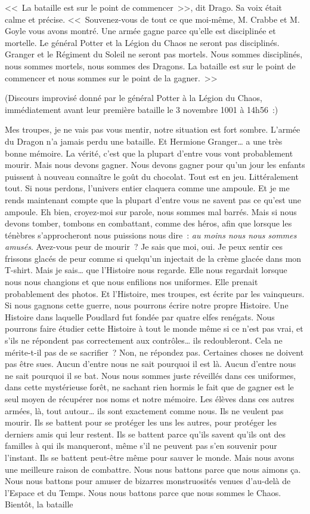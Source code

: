<<~La bataille est sur le point de commencer~>>, dit Drago. Sa voix était calme et précise. <<~Souvenez-vous de tout ce que moi-même, M. Crabbe et M. Goyle vous avons montré. Une armée gagne parce qu'elle est disciplinée et mortelle. Le général Potter et la Légion du Chaos ne seront pas disciplinés. Granger et le Régiment du Soleil ne seront pas mortels. Nous sommes disciplinés, nous sommes mortels, nous sommes des Dragons. La bataille est sur le point de commencer et nous sommes sur le point de la gagner.~>>

\later

(Discours improvisé donné par le général Potter à la Légion du Chaos, immédiatement avant leur première bataille le 3 novembre 1001 à 14h56~:)

Mes troupes, je ne vais pas vous mentir, notre situation est fort sombre. L'armée du Dragon n'a jamais perdu une bataille. Et Hermione Granger… a une très bonne mémoire. La vérité, c'est que la plupart d'entre vous vont probablement mourir. Mais nous devons gagner. Nous devons gagner pour qu'un jour les enfants puissent à nouveau connaître le goût du chocolat. Tout est en jeu. Littéralement tout. Si nous perdons, l'univers entier claquera comme une ampoule. Et je me rends maintenant compte que la plupart d'entre vous ne savent pas ce qu'est une ampoule. Eh bien, croyez-moi sur parole, nous sommes mal barrés. Mais si nous devons tomber, tombons en combattant, comme des héros, afin que lorsque les ténèbres s'approcheront nous puissions nous dire~: \emph{au moins nous nous sommes amusés}. Avez-vous peur de mourir~? Je sais que moi, oui. Je peux sentir ces frissons glacés de peur comme si quelqu'un injectait de la crème glacée dans mon T-shirt. Mais je sais… que l'Histoire nous regarde. Elle nous regardait lorsque nous nous changions et que nous enfilions nos uniformes. Elle prenait probablement des photos. Et l'Histoire, mes troupes, est écrite par les vainqueurs. Si nous gagnons cette guerre, nous pourrons écrire notre propre Histoire. Une Histoire dans laquelle Poudlard fut fondée par quatre elfes renégats. Nous pourrons faire étudier cette Histoire à tout le monde même si ce n'est pas vrai, et s'ils ne répondent pas correctement aux contrôles… ils redoubleront. Cela ne mérite-t-il pas de se sacrifier~? Non, ne répondez pas. Certaines choses ne doivent pas être sues. Aucun d'entre nous ne sait pourquoi il est là. Aucun d'entre nous ne sait pourquoi il se bat. Nous nous sommes juste réveillés dans ces uniformes, dans cette mystérieuse forêt, ne sachant rien hormis le fait que de gagner est le seul moyen de récupérer nos noms et notre mémoire. Les élèves dans ces autres armées, là, tout autour… ils sont exactement comme nous. Ils ne veulent pas mourir. Ils se battent pour se protéger les uns les autres, pour protéger les derniers amis qui leur restent. Ils se battent parce qu'ils savent qu'ils ont des familles à qui ils manqueront, même s'il ne peuvent pas s'en souvenir pour l'instant. Ils se battent peut-être même pour sauver le monde. Mais nous avons une meilleure raison de combattre. Nous nous battons parce que nous aimons ça. Nous nous battons pour amuser de bizarres monstruosités venues d'au-delà de l'Espace et du Temps. Nous nous battons parce que nous sommes le Chaos. Bientôt, la bataille 